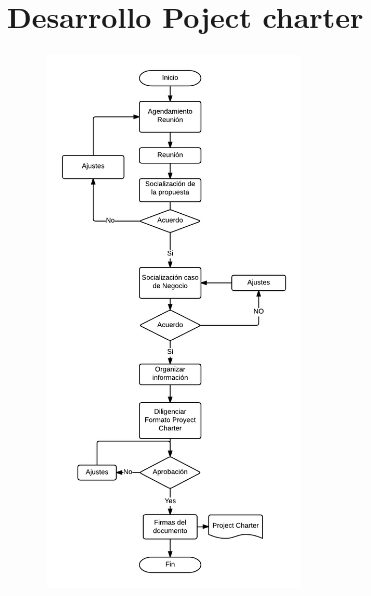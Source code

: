 \section{Desarrollo Poject charter}
%
\begin{figure}[H]
    \centering
    \includegraphics[width=0.6\textwidth]{images/DF-PDO2.png}
\end{figure}